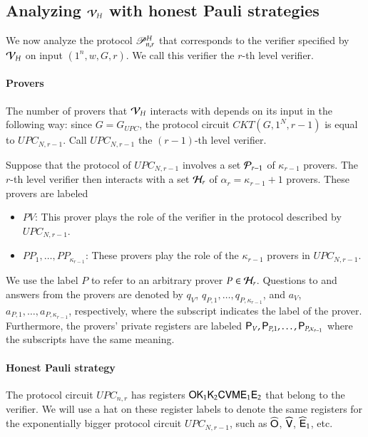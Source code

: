 \subsection{Analyzing $\mathcal V_H$ with honest Pauli strategies}

We now analyze the protocol $\mathscr{P}_{n,r}^H$ that corresponds to the verifier specified by $\mathcal V_H$ on input $(1^n,w,G,r)$. We call this verifier the $r$-th level verifier. 

\paragraph{Provers}

The number of provers that $\mathcal V_H$ interacts with depends on its input in the following way: since $G = G_{UPC}$, the protocol circuit $CKT(G,1^N,r-1)$ is equal to $UPC_{N,r-1}$. Call $UPC_{N,r-1}$ the $(r-1)$-th level verifier.

Suppose that the protocol of $UPC_{N,r-1}$ involves a set $\mathcal P_{r-1}$ of $\kappa_{r-1}$ provers. The $r$-th level verifier then interacts with a set $\mathcal H_r$ of $\alpha_r = \kappa_{r-1} + 1$ provers. These provers are labeled
\begin{itemize}
	\item $PV$: This prover plays the role of the verifier in the protocol described by $UPC_{N,r-1}$. 
	\item $PP_1,\ldots,PP_{\kappa_{r-1}}$: These provers play the role of the $\kappa_{r-1}$ provers in $UPC_{N,r-1}$.
\end{itemize}
We use the label $P$ to refer to an arbitrary prover $P\in\mathcal H_r$. Questions to and answers from the provers are denoted  by $q_V$, $q_{P,1},\ldots,q_{P,\kappa_{r-1}}$, and $a_V$, $a_{P,1},\ldots,a_{P,\kappa_{r-1}}$, respectively, where the subscript indicates the label of the prover. Furthermore, the provers' private registers are labeled ${\mathsf{P}}_V, {\mathsf{P}}_{P,1},\ldots,{\mathsf{P}}_{P,\kappa_{r-1}}$ where the subscripts have the same meaning.



\paragraph{Honest Pauli strategy} 
The protocol circuit $UPC_{n,r}$ has registers ${\mathsf{O}} {\mathsf{K}}_1 {\mathsf{K}}_2 {\mathsf{C}} {\mathsf{V}} {\mathsf{M}} {\mathsf{E}}_1 {\mathsf{E}}_2$ that belong to the verifier. We will use a hat on these register labels to denote the same registers for the exponentially bigger protocol circuit $UPC_{N,r-1}$, such as $\widehat{{\mathsf{O}}}$, $\widehat{{\mathsf{V}}}$, $\widehat{{\mathsf{E}}}_1$, etc.

